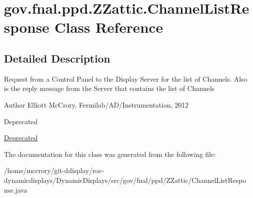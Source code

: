 \hypertarget{classgov_1_1fnal_1_1ppd_1_1ZZattic_1_1ChannelListResponse}{\section{gov.\-fnal.\-ppd.\-Z\-Zattic.\-Channel\-List\-Response Class Reference}
\label{classgov_1_1fnal_1_1ppd_1_1ZZattic_1_1ChannelListResponse}
}


\subsection{Detailed Description}
Request from a Control Panel to the Display Server for the list of Channels. Also is the reply message from the Server that contains the list of Channels

\begin{DoxyAuthor}{Author}
Elliott Mc\-Crory, Fermilab/\-A\-D/\-Instrumentation, 2012 
\end{DoxyAuthor}
\begin{DoxyRefDesc}{Deprecated}
\item[\hyperlink{deprecated__deprecated000010}{Deprecated}]\end{DoxyRefDesc}


The documentation for this class was generated from the following file\-:\begin{DoxyCompactItemize}
\item 
/home/mccrory/git-\/ddisplay/roc-\/dynamicdisplays/\-Dynamic\-Displays/src/gov/fnal/ppd/\-Z\-Zattic/Channel\-List\-Response.\-java\end{DoxyCompactItemize}
